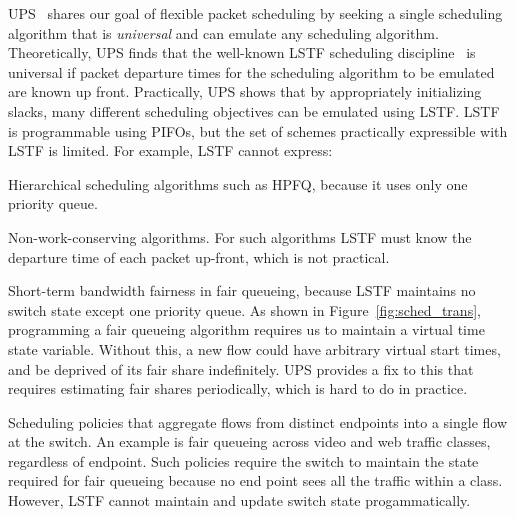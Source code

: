  UPS~\cite{ups} shares our goal of
flexible packet scheduling by seeking a single scheduling algorithm that is
{\em universal} and can emulate any scheduling algorithm. Theoretically, UPS
finds that the well-known LSTF scheduling discipline~\cite{lstf} is universal
if packet departure times for the scheduling algorithm to be emulated are known
up front. Practically, UPS shows that by appropriately initializing slacks, many different scheduling objectives can be
emulated using LSTF. LSTF is programmable using PIFOs, but the set of schemes
practically expressible with LSTF is limited. For example, LSTF cannot
express:
\begin{CompactEnumerate}
\item Hierarchical scheduling algorithms such as HPFQ, because it
  uses only one priority queue.
\item Non-work-conserving algorithms. For such algorithms LSTF must know the
  departure time of each packet up-front, which is not practical.
\item Short-term bandwidth fairness in fair queueing, because LSTF maintains no
  switch state except one priority queue. As shown in
  Figure~\ref{fig:sched_trans}, programming a fair queueing algorithm requires us
  to maintain a virtual time state variable. Without this, a new flow could have
  arbitrary virtual start times, and be deprived of its fair share indefinitely.
  UPS provides a fix to this that requires
  estimating fair shares periodically, which is hard to do in
  practice.
\item Scheduling policies that aggregate flows from distinct endpoints into a
  single flow at the switch. An example is fair queueing across video and web
  traffic classes, regardless of endpoint.  Such policies require the switch to
  maintain the state required for fair queueing because no end point sees all the
  traffic within a class.  However, LSTF cannot maintain and update switch state
  progammatically.
\end{CompactEnumerate}


